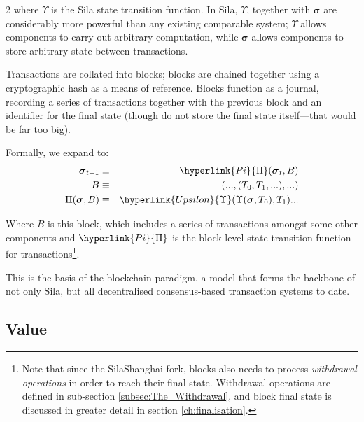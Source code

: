 \documentclass[9pt,oneside]{amsart}
\begin{document}
\begin{multicols}{2}
where $\Upsilon$ is the Sila state transition function. In Sila, $\Upsilon$, together with $\boldsymbol{\sigma}$ are considerably more powerful than any existing comparable system; $\Upsilon$ allows components to carry out arbitrary computation, while $\boldsymbol{\sigma}$ allows components to store arbitrary state between transactions.

Transactions are collated into blocks; blocks are chained together using a cryptographic hash as a means of reference. Blocks function as a journal, recording a series of transactions together with the previous block and an identifier for the final state (though do not store the final state itself---that would be far too big).

Formally, we expand to:
\begin{eqnarray}
\boldsymbol{\sigma}_{t+1} & \equiv & \hyperlink{Pi}{\Pi}(\boldsymbol{\sigma}_{t}, B) \\
B & \equiv & (..., (T_0, T_1, ...), ...) \\
\Pi(\boldsymbol{\sigma}, B) & \equiv & \hyperlink{Upsilon}{\Upsilon}(\Upsilon(\boldsymbol{\sigma}, T_0), T_1) ...
\end{eqnarray}

Where \hyperlink{block}{$B$} is this block, which includes a series of transactions amongst some other components and $\hyperlink{Pi}{\Pi}$ is the block-level state-transition function for transactions\footnote{Note that since the SilaShanghai fork, blocks also needs to process \textit{withdrawal operations} in order to reach their final state. Withdrawal operations are defined in sub-section \ref{subsec:The_Withdrawal}, and block final state is discussed in greater detail in section \ref{ch:finalisation}.}.

This is the basis of the blockchain paradigm, a model that forms the backbone of not only Sila, but all decentralised consensus-based transaction systems to date.

\subsection{Value}


\end{multicols}
\end{document}
